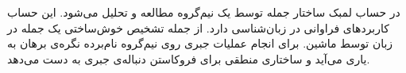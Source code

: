 
در حساب لمبک ساختار جمله توسط یک نیم‌گروه مطالعه و تحلیل می‌شود. این حساب کاربردهای فراوانی در زبان‌شناسی دارد. از جمله تشخیص خوش‌ساختی یک جمله در زبان توسط ماشین. برای انجام عملیات جبری روی نیم‌گروه نام‌برده نگره‌ی برهان به یاری می‌آید و ساختاری منطقی برای فروکاستن دنباله‌ی جبری به دست می‌دهد.